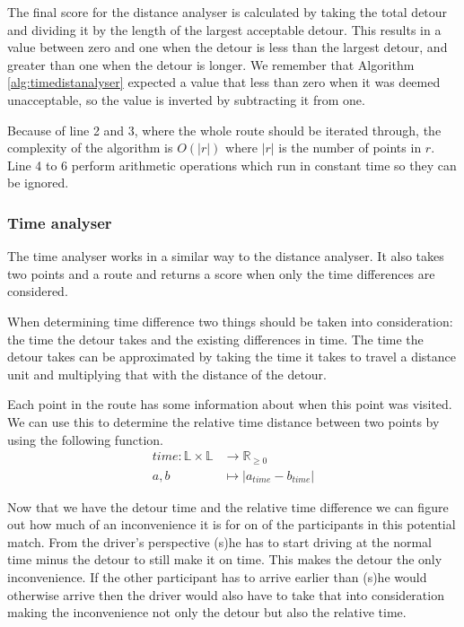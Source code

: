 The final score for the distance analyser is calculated by taking the total detour and dividing it by the length of the largest acceptable detour.
This results in a value between zero and one when the detour is less than the largest detour, and greater than one when the detour is longer.
We remember that Algorithm \ref{alg:timedistanalyser} expected a value that less than zero when it was deemed unacceptable, so the value is inverted by subtracting it from one.

Because of line 2 and 3, where the whole route should be iterated through, the complexity of the algorithm is $O(|r|)$ where $|r|$ is the number of points in $r$.
Line 4 to 6 perform arithmetic operations which run in constant time so they can be ignored.

\subsubsection{Time analyser}

The time analyser works in a similar way to the distance analyser. 
It also takes two points and a route and returns a score when only the time differences are considered.

When determining time difference two things should be taken into consideration: the time the detour takes and the existing differences in time.
The time the detour takes can be approximated by taking the time it takes to travel a distance unit and multiplying that with the distance of the detour.

Each point in the route has some information about when this point was visited.
We can use this to determine the relative time distance between two points by using the following function.
\begin{align*}
	time : \mathbb{L}\times\mathbb{L} &\rightarrow \mathbb{R}_{\geq 0}\\
	a, b &\mapsto | a_{time} - b_{time} |
\end{align*}

Now that we have the detour time and the relative time difference we can figure out how much of an inconvenience it is for on of the participants in this potential match.
From the driver's perspective (s)he has to start driving at the normal time minus the detour to still make it on time.
This makes the detour the only inconvenience.
If the other participant has to arrive earlier than (s)he would otherwise arrive then the driver would also have to take that into consideration making the inconvenience not only the detour but also the relative time.

